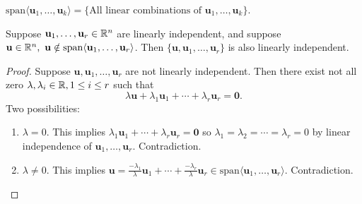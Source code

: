 \documentclass[10pt, a4paper]{article}
\newcommand{\mbf}[1]{\mathbf{#1}}
\begin{document}
$\mathrm{span}\langle\mbf{u}_1, \dotsc, \mbf{u}_k\rangle = \{\text{All linear combinations of }\mbf{u}_1, \dotsc, \mbf{u}_k\}$.

\begin{proposition}
    Suppose $\mbf{u}_1, \dotsc, \mbf{u}_r \in \R ^ n$ are linearly independent,
    and suppose $\mbf{u} \in \R ^ n,\ \mbf{u} \notin \mathrm{span}\langle\mbf{u}_1, \dotsc, \mbf{u}_r\rangle$.
    Then $\{\mbf{u}, \mbf{u}_1, \dotsc, \mbf{u}_r\}$ is also linearly independent.
    \begin{proof}
        Suppose $\mbf{u}, \mbf{u}_1, \dotsc, \mbf{u}_r$ are not linearly independent.
        Then there exist not all zero $\lambda, \lambda_i \in \mathbb{R}, 1 \leq i \leq r$
        such that
        \[
        \lambda\mbf{u} + \lambda_1\mbf{u}_1 + \dotsi + \lambda_r\mbf{u}_r = \mbf{0}.
        \]
        Two possibilities:
        \begin{enumerate}[label = (\arabic*)]
            \item $\lambda = 0$.
            This implies $\lambda_1\mbf{u}_1 + \dotsi + \lambda_r\mbf{u}_r = \mbf{0}$ so $\lambda_1 = \lambda_2 = \dotsi = \lambda_r = 0$ by linear independence of $\mbf{u}_1, \dotsc, \mbf{u}_r$.
            Contradiction.
            \item $\lambda \neq 0$.
            This implies $\mbf{u} = \frac{-\lambda_1}{\lambda}\mbf{u}_1 + \dotsi + \frac{-\lambda_r}{\lambda}\mbf{u}_r \in \mathrm{span}\langle\mbf{u}_1, \dotsc, \mbf{u}_r\rangle$.
            Contradiction.
        \end{enumerate}
    \end{proof}
\end{proposition}
\end{document}
